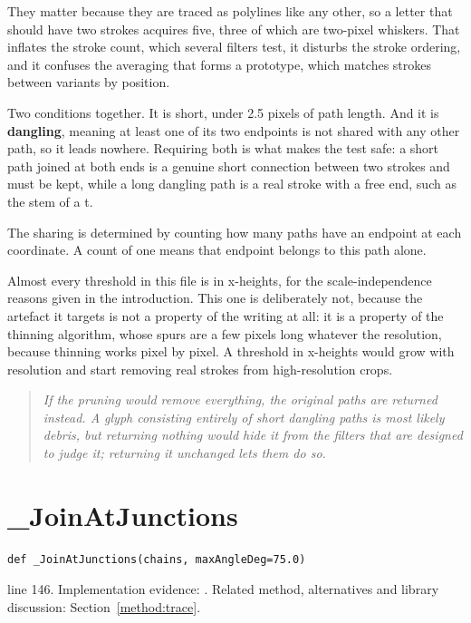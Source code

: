 They matter because they are traced as polylines like any other, so a letter that should have two strokes acquires five, three of which are two-pixel whiskers. That inflates the stroke count, which several filters test, it disturbs the stroke ordering, and it confuses the averaging that forms a prototype, which matches strokes between variants by position.


Two conditions together. It is short, under 2.5 pixels of path length. And it is \textbf{dangling}, meaning at least one of its two endpoints is not shared with any other path, so it leads nowhere. Requiring both is what makes the test safe: a short path joined at both ends is a genuine short connection between two strokes and must be kept, while a long dangling path is a real stroke with a free end, such as the stem of a t.

The sharing is determined by counting how many paths have an endpoint at each coordinate. A count of one means that endpoint belongs to this path alone.


Almost every threshold in this file is in x-heights, for the scale-independence reasons given in the introduction. This one is deliberately not, because the artefact it targets is not a property of the writing at all: it is a property of the thinning algorithm, whose spurs are a few pixels long whatever the resolution, because thinning works pixel by pixel. A threshold in x-heights would grow with resolution and start removing real strokes from high-resolution crops.


\begin{quote}\small\itshape If the pruning would remove everything, the original paths are returned instead. A glyph consisting entirely of short dangling paths is most likely debris, but returning nothing would hide it from the filters that are designed to judge it; returning it unchanged lets them do so.\end{quote}


\section{\_JoinAtJunctions}\label{fn:style:-JoinAtJunctions}
\begin{lstlisting}[style=sig]
def _JoinAtJunctions(chains, maxAngleDeg=75.0)
\end{lstlisting}
 line 146. Implementation evidence: \cite{code2026}. Related method, alternatives and library discussion: Section~\ref{method:trace}.


